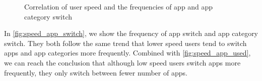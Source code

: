 \begin{figure}
    \centering
    \caption{Correlation of user speed and the frequencies of app and app category switch}
    \label{fig:speed_app_switch}
\end{figure}

In \autoref{fig:speed_app_switch}, we show the frequency of app switch and app category switch. They both follow the same trend that lower speed users tend to switch apps and app categories more frequently. Combined with \autoref{fig:speed_app_used}, we can reach the conclusion that although low speed users switch apps more frequently, they only switch between fewer number of apps.


